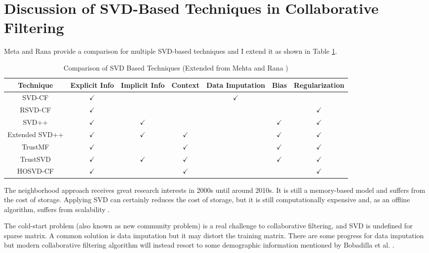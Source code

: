 \documentclass[letter paper, 11pt]{article}
\begin{document}
	
	\section{Discussion of SVD-Based Techniques in Collaborative Filtering}

	Meta and Rana provide a comparison for multiple SVD-based techniques and I extend it as shown in Table \ref{tab:comparison}.
	\begin{table}[H]
		\centering
		\begin{tabular}{|c|c|c|c|c|c|c|}
			\hline
			Technique & Explicit Info & Implicit Info & Context & Data Imputation & Bias & Regularization \\ \hline
			SVD-CF & $\checkmark$ & & & $\checkmark$ &  &  \\ \hline
			RSVD-CF & $\checkmark$ & & & &  & $\checkmark$ \\ \hline
			SVD++ & $\checkmark$ & $\checkmark$ & & & $\checkmark$ & $\checkmark$ \\ \hline
			Extended SVD++ \cite{contextual}& $\checkmark$ &$\checkmark$&$\checkmark$& & $\checkmark$ & $\checkmark$ \\ \hline
			TrustMF \cite{TrustMF}& $\checkmark$ & &$\checkmark$& & $\checkmark$ & $\checkmark$ \\ \hline
			TrustSVD & $\checkmark$ & $\checkmark$ & $\checkmark$ & & $\checkmark$ & $\checkmark$ \\ \hline
			HOSVD-CF \cite{tensor} & $\checkmark$ & & $\checkmark$ & & & $\checkmark$ \\ \hline
		\end{tabular}
		\caption{Comparison of SVD Based Techniques (Extended from Mehta and Rana \cite{review})}
		\label{tab:comparison}
	\end{table}
	
	The neighborhood approach receives great research interests in 2000s until around 2010s. It is still a memory-based model and suffers from the cost of storage. Applying SVD can certainly reduces the cost of storage, but it is still computationally expensive and, as an offline algorithm, suffers from scalability \cite{RSsurvey}.
	
	
	The cold-start problem (also known as new community problem) is a real challenge to collaborative filtering, and SVD is undefined for sparse matrix. A common solution is data imputation but it may distort the training matrix. There are some progress for data imputation \cite{ISVD} but modern collaborative filtering algorithm will instead resort to some demographic information mentioned by Bobadilla et al. \cite{RSsurvey}.
	
\end{document}
